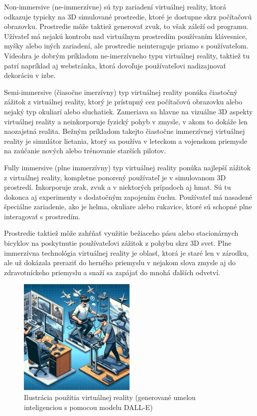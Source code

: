 Non-immersive (ne-immerzívne) sú typ zariadení virtuálnej reality, ktorá odkazuje typicky na 3D simulované prostredie, ktoré je dostupne skrz počítačovú obrazovku. Prostredie môže taktiež generovať zvuk, to však záleží od programu. Užívateľ má nejakú kontrolu nad virtuálnym prostredím používaním klávesnice, myšky alebo iných zariadení, ale prostredie neinteraguje priamo s používateľom. Videohra je dobrým príkladom ne-imerzívneho typu virtuálnej reality, taktiež tu patrí napríklad aj webstránka, ktorá dovoľuje používateľovi nadizajnovať dekoráciu v izbe. 

Semi-immersive (čiasočne imerzívny) typ virtuálnej reality ponúka čiastočný zážitok z virtuálnej reality, ktorý je prístupný cez počítačovú obrazovku alebo nejaký typ okuliarí alebo sluchatiek. Zameriava sa hlavne na vizuálne 3D aspekty virtuálnej reality a neinkorporuje fyzický pohyb v zmysle, v akom to dokáže len naozajstná realita. Bežným príkladom takejto čiastočne immerzívnej virtuálnej reality je simulátor lietania, ktorý sa používa v leteckom a vojenskom priemysle na zaúčanie nových alebo trénovanie starších pilotov. 

Fully immersive (plne immerzívny) typ virtuálnej reality ponúka najlepší zážitok z virtuálnej reality, kompletne ponorený používateľ je v simulovanom 3D prostredí. Inkorporuje zrak, zvuk a v niektorých prípadoch aj hmat. Sú tu dokonca aj experimenty s dodatočným zapojením čuchu. Používateľ má nasadené špeciálne zariadenie, ako je helma, okuliare alebo rukavice, ktoré sú schopné plne interagovať s prostredím.

Prostredie taktiež môže zahŕňať využitie bežiaceho pásu alebo stacionárnych bicyklov na poskytnutie používateľovi zážitok z pohybu skrz 3D svet. Plne immerzívna technológia virtuálnej reality je oblasť, ktorá je staré len v zárodku, ale už dokázala preraziť do herného priemyslu v nejakom slova zmysle aj do zdravotníckeho priemyslu a snaží sa zapájať do mnohá ďalších odvetví. \cite{sheldon2022vr}

\begin{figure}[h]
  \centering
  \includegraphics[width=0.5\textwidth]{img/virtualna_realita.png}
  \caption{Ilustrácia použitia virtuálnej reality (generované umelou inteligenciou s pomocou modelu DALL-E)}
  \label{fig:vir_real}
\end{figure}

